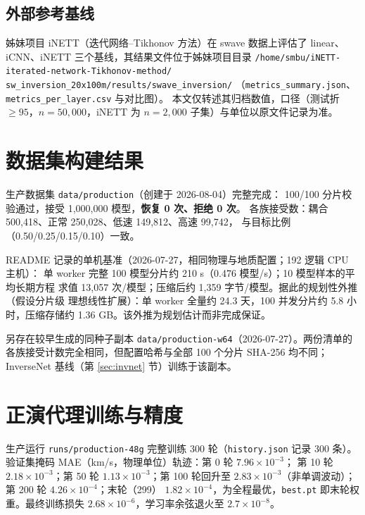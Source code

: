 \documentclass[UTF8,a4paper,11pt]{ctexart}
\begin{document}
\subsection{外部参考基线}
姊妹项目 iNETT（迭代网络--Tikhonov 方法）在 swave 数据上评估了 linear、iCNN、iNETT
三个基线，其结果文件位于姊妹项目目录
\texttt{/home/smbu/}\allowbreak\texttt{iNETT-iterated-network-Tikhonov-method/}\allowbreak
\texttt{sw\_inversion\_20x100m/}\allowbreak\texttt{results/}\allowbreak\texttt{swave\_inversion/}
（\texttt{metrics\_summary.json}、\texttt{metrics\_per\_layer.csv} 与对比图）。
本文仅转述其归档数值，口径（测试折 \(\geq95\)，\(n=50{,}000\)，iNETT 为
\(n=2{,}000\) 子集）与单位以原文件记录为准。

\section{数据集构建结果}\label{sec:data}
生产数据集 \texttt{data/production}（创建于 2026-08-04）完整完成：
100/100 分片校验通过，接受 1{,}000{,}000 模型，\textbf{恢复 0 次、拒绝 0 次}。
各族接受数：耦合 500{,}418、正常 250{,}028、低速 149{,}812、高速 99{,}742，
与目标比例（0.50/0.25/0.15/0.10）一致。

README 记录的单机基准（2026-07-27，相同物理与地质配置；192 逻辑 CPU 主机）：
单 worker 完整 100 模型分片约 210 s（0.476 模型/s）；10 模型样本的平均长期方程
求值 13{,}057 次/模型；压缩后约 1{,}359 字节/模型。据此的规划性外推（假设分片级
理想线性扩展）：单 worker 全量约 24.3 天，100 并发分片约 5.8 小时，压缩存储约
1.36 GB。该外推为规划估计而非完成保证。

另存在较早生成的同种子副本 \texttt{data/production-w64}（2026-07-27）。两份清单的
各族接受计数完全相同，但配置哈希与全部 100 个分片 SHA-256 均不同；
InverseNet 基线（第 \ref{sec:invnet} 节）训练于该副本。

\section{正演代理训练与精度}\label{sec:surrogate}
生产运行 \texttt{runs/production-48g} 完整训练 300 轮（\texttt{history.json} 记录
300 条）。验证集掩码 MAE（km/s，物理单位）轨迹：第 0 轮 \(7.96\times10^{-3}\)；
第 10 轮 \(2.18\times10^{-3}\)；第 50 轮 \(1.13\times10^{-3}\)；第 100 轮回升至
\(2.83\times10^{-3}\)（非单调波动）；第 200 轮 \(4.26\times10^{-4}\)；末轮（299）
\(1.82\times10^{-4}\)，为全程最优，\texttt{best.pt} 即末轮权重。最终训练损失
\(2.68\times10^{-6}\)，学习率余弦退火至 \(2.7\times10^{-8}\)。
\end{document}
